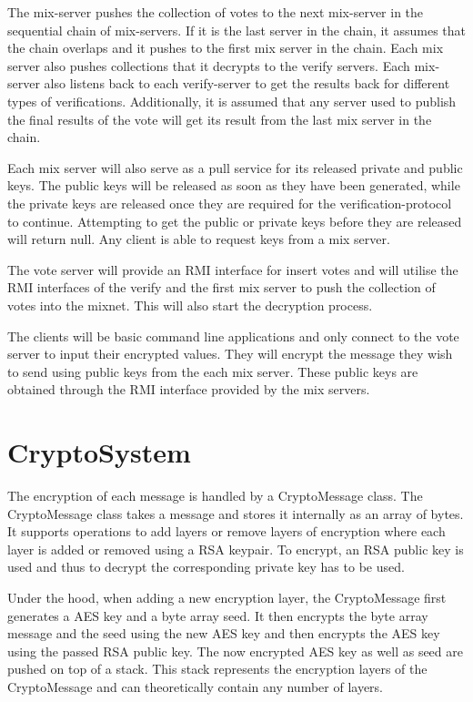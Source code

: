 \documentclass[a4paper,11pt]{kth-mag}
\begin{document}
The mix-server pushes the collection of votes to the next mix-server in the sequential chain of mix-servers. If it is the last server in the chain, it assumes that the chain overlaps and it pushes to the first mix server in the chain. Each mix server also pushes collections that it decrypts to the verify servers. Each mix-server also listens back to each verify-server to get the results back for different types of verifications. Additionally, it is assumed that any server used to publish the final results of the vote will get its result from the last mix server in the chain.

Each mix server will also serve as a pull service for its released private and public keys. The public keys will be released as soon as they have been generated, while the private keys are released once they are required for the verification-protocol to continue. Attempting to get the public or private keys before they are released will return null. Any client is able to request keys from a mix server.

The vote server will provide an RMI interface for insert votes and will utilise the RMI interfaces of the verify and the first mix server to push the collection of votes into the mixnet. This will also start the decryption process.

The clients will be basic command line applications and only connect to the vote server to input their encrypted values. They will encrypt the message they wish to send using public keys from the each mix server. These public keys are obtained through the RMI interface provided by the mix servers.

\section{CryptoSystem}

The encryption of each message is handled by a CryptoMessage class. The CryptoMessage class takes a message and stores it internally as an array of bytes. It supports operations to add layers or remove layers of encryption where each layer is added or removed using a RSA keypair. To encrypt, an RSA public key is used and thus to decrypt the corresponding private key has to be used.

Under the hood, when adding a new encryption layer, the CryptoMessage first generates a AES key and a byte array seed. It then encrypts the byte array message and the seed using the new AES key and then encrypts the AES key using the passed RSA public key. The now encrypted AES key as well as seed are pushed on top of a stack. This stack represents the encryption layers of the CryptoMessage and can theoretically contain any number of layers.
\end{document}
